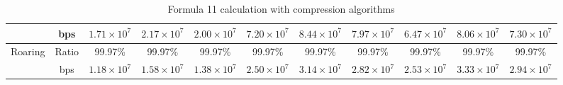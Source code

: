 \begin{table}[h]
{\begin{tabular}{|c|c|c|c|c|c|c|c|c|c|c|}
\cline{2-11}
& bps & $1.71 \times 10^{7}$ & $2.17 \times 10^{7}$ & $2.00 \times 10^{7}$ & $7.20 \times 10^{7}$ & $8.44 \times 10^{7}$ & $7.97 \times 10^{7}$ & $6.47 \times 10^{7}$ & $8.06 \times 10^{7}$ & $7.30 \times 10^{7}$ \\
\hline
\multirow{2}{*}{Roaring} & Ratio & 99.97\% & 99.97\% & 99.97\% & 99.97\% & 99.97\% & 99.97\% & 99.97\% & 99.97\% & 99.97\% \\
\cline{2-11}
& bps & $1.18 \times 10^{7}$ & $1.58 \times 10^{7}$ & $1.38 \times 10^{7}$ & $2.50 \times 10^{7}$ & $3.14 \times 10^{7}$ & $2.82 \times 10^{7}$ & $2.53 \times 10^{7}$ & $3.33 \times 10^{7}$ & $2.94 \times 10^{7}$ \\
\hline
\end{tabular}
}
\caption{Formula 11 calculation with compression algorithms}
\label{tbl:formulacompress11}
\end{table}


